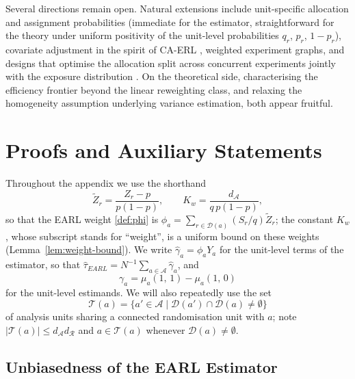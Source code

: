 \documentclass[sigconf]{acmart}
\newcounter{assumption}
\begin{document}
Several directions remain open. Natural extensions include unit-specific allocation and assignment probabilities (immediate for the estimator, straightforward for the theory under uniform positivity of the unit-level probabilities $q_r$, $p_r$, $1-p_r$), covariate adjustment in the spirit of CA-ERL \cite{shi2025scalableanalysisbipartiteexperiments}, weighted experiment graphs, and designs that optimise the allocation split across concurrent experiments jointly with the exposure distribution \cite{harshaw2023erl,brennan2022cluster}. On the theoretical side, characterising the efficiency frontier beyond the linear reweighting class, and relaxing the homogeneity assumption underlying variance estimation, both appear fruitful.




\appendix

\section{Proofs and Auxiliary Statements}\label{app:proofs}

Throughout the appendix we use the shorthand
\begin{equation}\label{def:Kw}
    \tilde Z_r = \frac{Z_r-p}{p(1-p)},\qquad
    K_w = \frac{d_{\mathcal A}}{q\,p(1-p)},
\end{equation}
so that the EARL weight \eqref{def:phi} is $\phi_a = \sum_{r\in\mathcal D(a)}(S_r/q)\tilde Z_r$; the constant $K_w$, whose subscript stands for ``weight'', is a uniform bound on these weights (Lemma~\ref{lem:weight-bound}). We write $\hat\gamma_a=\phi_aY_a$ for the unit-level terms of the estimator, so that $\hat\tau_{EARL}=N^{-1}\sum_{a\in\mathcal A}\hat\gamma_a$, and
\begin{equation}\label{def:gamma-a}
    \gamma_a = \mu_a(1,\,1) - \mu_a(1,\,0)
\end{equation}
for the unit-level estimands. We will also repeatedly use the set
\begin{equation*}
    \mathcal T(a) = \{a'\in\mathcal A\mid \mathcal D(a')\cap \mathcal D(a) \neq \emptyset\}
\end{equation*}
of analysis units sharing a connected randomisation unit with $a$; note $|\mathcal T(a)|\le d_{\mathcal A}d_{\mathcal R}$ and $a\in\mathcal T(a)$ whenever $\mathcal D(a)\neq\emptyset$.

\subsection{Unbiasedness of the EARL Estimator}
\end{document}
